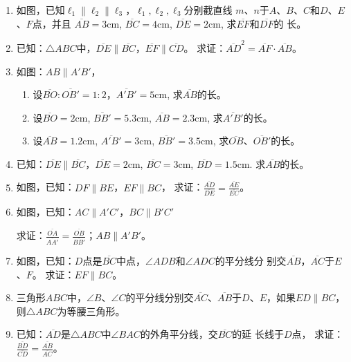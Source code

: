 \begin{Practice}
\begin{enumerate}
    \item 如图，已知$\ell_1\parallel \ell_2\parallel \ell_3$，$\ell_1,\ell_2,\ell_3$分别截直线
    $m$、$n$于$A$、$B$、$C$和$D$、$E$、$F$点，并且
    $\overline{AB}=3$cm, $\overline{BC}=4$cm, 
    $\overline{DE}=2$cm, 求$\overline{EF}$和$\overline{DF}$的
    长。

\item 已知：$\triangle ABC$中，$\overline{DE}\parallel \overline{BC}$，$\overline{EF}\parallel \overline{CD}$。
求证：$\overline{AD}^2=\overline{AF}\cdot \overline{AB}$。

\item 如图：$AB\parallel A'B'$，
\begin{enumerate}
\item 设$\overline{BO}:\overline{OB'}=1:2$，$\overline{A'B'}=5$cm, 求$\overline{AB}$的长。
\item 设$\overline{BO}=2$cm, $\overline{BB'}=5.3$cm, $\overline{AB}=2.3$cm, 求$\overline{A'B'}$的长。
\item 设$\overline{AB}=1.2$cm, $\overline{A'B'}=3$cm, $\overline{BB'}=3.5$cm, 
求$\overline{OB}$、$\overline{OB'}$的长。
\end{enumerate}

\item 已知：$\overline{DE}\parallel \overline{BC}$，$\overline{DE}=2$cm, $\overline{BC}=3$cm, 
$\overline{BD}=1.5$cm. 
求$\overline{AB}$的长。
\item 如图，已知：$DF\parallel BE$，$EF\parallel BC$，
求证：$\frac{\overline{AD}}{\overline{DE}}=\frac{\overline{AE}}{\overline{EC}}$。

\item 如图，已知：$AC\parallel A'C'$，$BC\parallel B'C'$

求证：$\frac{\overline{OA}}{\overline{AA'}}=\frac{\overline{OB}}{\overline{BB'}}$；$AB\parallel A'B'$。
\item 如图，已知：$D$点是$\overline{BC}$中点，$\angle ADB$和$\angle ADC$的平分线分
别交$\overline{AB}$，$\overline{AC}$于$E$、$F$。
求证：$EF\parallel BC$。

\item 三角形$ABC$中，$\angle B$、$\angle C$的平分线分别交$\overline{AC}$、$\overline{AB}$于$D$、$E$，如果$ED\parallel BC$，则$\triangle ABC$为等腰三角形。
\item 已知：$\overline{AD}$是$\triangle ABC$中$\angle BAC$的外角平分线，交$\overline{BC}$的延
长线于$D$点，
求证：$\frac{\overline{BD}}{\overline{CD}}=\frac{\overline{AB}}{\overline{AC}}$。
\end{enumerate}
\end{Practice}
    
